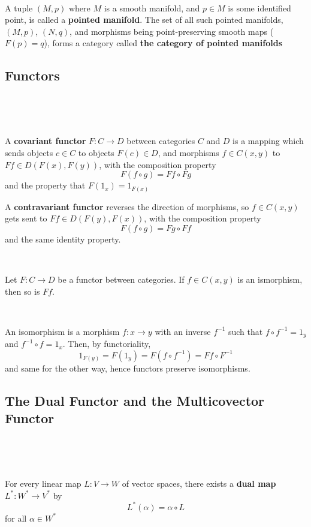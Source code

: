 \documentclass{article}
\begin{document}
\begin{example}
  \

  A tuple $(M,p)$ where $M$ is a smooth manifold, and $p \in M$ is some identified point, is called a \textbf{pointed manifold}. The set of all such pointed manifolds, $(M,p)$, $(N,q)$, and morphisms being point-preserving smooth maps ($F(p) = q$), forms a category called \textbf{the category of pointed manifolds}
\end{example}

\subsection{Functors}
\

\begin{definition}[Functors]
  \

  A \textbf{covariant functor} $F: C \to D$ between categories $C$ and $D$ is a mapping which sends objects $c \in C$ to objects $F(c) \in D$, and morphisms $f \in C(x,y)$ to $Ff \in D(F(x), F(y))$, with the composition property $$F(f \circ g) = Ff \circ Fg$$and the property that $F(1_x) = 1_{F(x)}$

  A \textbf{contravariant functor} reverses the direction of morphisms, so $f \in C(x,y)$ gets sent to $Ff \in D(F(y), F(x))$, with the composition property $$F(f \circ g) = Fg \circ Ff$$and the same identity property.
\end{definition}

\begin{proposition}
  \

  Let $F: C \to D$ be a functor between categories. If $f \in C(x,y)$ is an ismorphism, then so is $Ff$.
\end{proposition}

\begin{customproof}
  \

  An isomorphism is a morphism $f: x \to y$ with an inverse $f ^{-1}$ such that $f \circ f ^{-1} = 1_y$ and $f ^{-1} \circ f = 1_x$. Then, by functoriality, $$1_{F(y)} = F(1_y) = F(f \circ f ^{-1}) = Ff \circ F ^{-1}$$and same for the other way, hence functors preserve isomorphisms.
\end{customproof}

\subsection{The Dual Functor and the Multicovector Functor}
\

\begin{definition}
  \

  For every linear map $L: V \to W$ of vector spaces, there exists a \textbf{dual map} $L^*: W^* \to V^*$ by $$L^*(\alpha) = \alpha \circ L$$ for all $\alpha \in W^*$
\end{definition}
\end{document}
